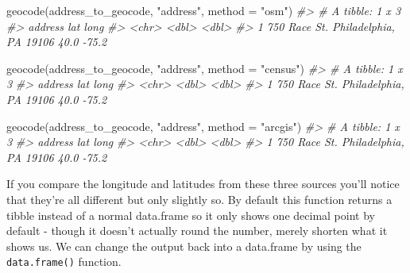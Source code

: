 \documentclass[
]{krantz}
\makeatletter
\newenvironment{Shaded}{\begin{snugshade}}{\end{snugshade}}
\newcommand{\AttributeTok}[1]{\textcolor[rgb]{0.61,0.61,0.61}{#1}}
\newcommand{\CommentTok}[1]{\textcolor[rgb]{0.37,0.37,0.37}{\textit{#1}}}
\newcommand{\FunctionTok}[1]{\textcolor[rgb]{0,0,0}{#1}}
\newcommand{\NormalTok}[1]{#1}
\newcommand{\StringTok}[1]{\textcolor[rgb]{0.5,0.5,0.5}{#1}}
\newenvironment{kframe}{%
\medskip{}
\setlength{\fboxsep}{.8em}
 \def\at@end@of@kframe{}%
 \ifinner\ifhmode%
  \def\at@end@of@kframe{\end{minipage}}%
  \begin{minipage}{\columnwidth}%
 \fi\fi%
 \def\FrameCommand##1{\hskip\@totalleftmargin \hskip-\fboxsep
 \colorbox{shadecolor}{##1}\hskip-\fboxsep
     \hskip-\linewidth \hskip-\@totalleftmargin \hskip\columnwidth}%
 \MakeFramed {\advance\hsize-\width
   \@totalleftmargin\z@ \linewidth\hsize
   \@setminipage}}%
 {\par\unskip\endMakeFramed%
 \at@end@of@kframe}
\renewenvironment{Shaded}{\begin{kframe}}{\end{kframe}}
\makeatother
\begin{document}
\begin{Shaded}
\begin{Highlighting}[]
\FunctionTok{geocode}\NormalTok{(address\_to\_geocode, }\StringTok{"address"}\NormalTok{, }\AttributeTok{method =} \StringTok{"osm"}\NormalTok{)}
\CommentTok{\#\textgreater{} \# A tibble: 1 x 3}
\CommentTok{\#\textgreater{}   address                               lat  long}
\CommentTok{\#\textgreater{}   \textless{}chr\textgreater{}                               \textless{}dbl\textgreater{} \textless{}dbl\textgreater{}}
\CommentTok{\#\textgreater{} 1 750 Race St. Philadelphia, PA 19106  40.0 {-}75.2}
\end{Highlighting}
\end{Shaded}

\begin{Shaded}
\begin{Highlighting}[]
\FunctionTok{geocode}\NormalTok{(address\_to\_geocode, }\StringTok{"address"}\NormalTok{, }\AttributeTok{method =} \StringTok{"census"}\NormalTok{)}
\CommentTok{\#\textgreater{} \# A tibble: 1 x 3}
\CommentTok{\#\textgreater{}   address                               lat  long}
\CommentTok{\#\textgreater{}   \textless{}chr\textgreater{}                               \textless{}dbl\textgreater{} \textless{}dbl\textgreater{}}
\CommentTok{\#\textgreater{} 1 750 Race St. Philadelphia, PA 19106  40.0 {-}75.2}
\end{Highlighting}
\end{Shaded}

\begin{Shaded}
\begin{Highlighting}[]
\FunctionTok{geocode}\NormalTok{(address\_to\_geocode, }\StringTok{"address"}\NormalTok{, }\AttributeTok{method =} \StringTok{"arcgis"}\NormalTok{)}
\CommentTok{\#\textgreater{} \# A tibble: 1 x 3}
\CommentTok{\#\textgreater{}   address                               lat  long}
\CommentTok{\#\textgreater{}   \textless{}chr\textgreater{}                               \textless{}dbl\textgreater{} \textless{}dbl\textgreater{}}
\CommentTok{\#\textgreater{} 1 750 Race St. Philadelphia, PA 19106  40.0 {-}75.2}
\end{Highlighting}
\end{Shaded}

If you compare the longitude and latitudes from these three sources you'll notice that they're all different but only slightly so. By default this function returns a tibble instead of a normal data.frame so it only shows one decimal point by default - though it doesn't actually round the number, merely shorten what it shows us. We can change the output back into a data.frame by using the \texttt{data.frame()} function.
\end{document}

